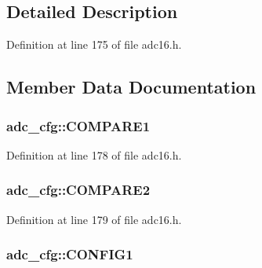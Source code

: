 \subsection{Detailed Description}


Definition at line 175 of file adc16.\+h.



\subsection{Member Data Documentation}
\subsubsection[{\texorpdfstring{C\+O\+M\+P\+A\+R\+E1}{COMPARE1}}]{ adc\+\_\+cfg\+::\+C\+O\+M\+P\+A\+R\+E1}\hypertarget{structadc__cfg_a742f5e0419fc115709222b4f5129384d}{}\label{structadc__cfg_a742f5e0419fc115709222b4f5129384d}


Definition at line 178 of file adc16.\+h.

\subsubsection[{\texorpdfstring{C\+O\+M\+P\+A\+R\+E2}{COMPARE2}}]{ adc\+\_\+cfg\+::\+C\+O\+M\+P\+A\+R\+E2}\hypertarget{structadc__cfg_ae2cbcfb9ef47bef2913d441b28b06572}{}\label{structadc__cfg_ae2cbcfb9ef47bef2913d441b28b06572}


Definition at line 179 of file adc16.\+h.

\subsubsection[{\texorpdfstring{C\+O\+N\+F\+I\+G1}{CONFIG1}}]{ adc\+\_\+cfg\+::\+C\+O\+N\+F\+I\+G1}\hypertarget{structadc__cfg_a3d6b4a9478cafdee4e7a46beab3c0597}{}\label{structadc__cfg_a3d6b4a9478cafdee4e7a46beab3c0597}



